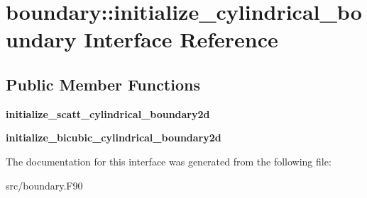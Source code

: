 \hypertarget{interfaceboundary_1_1initialize__cylindrical__boundary}{}\section{boundary\+:\+:initialize\+\_\+cylindrical\+\_\+boundary Interface Reference}
\label{interfaceboundary_1_1initialize__cylindrical__boundary}
\subsection*{Public Member Functions}
\begin{DoxyCompactItemize}
\item 
\mbox{\label{interfaceboundary_1_1initialize__cylindrical__boundary_a6fdef441d406e174754c61aff96a032e}} 
{\bfseries initialize\+\_\+scatt\+\_\+cylindrical\+\_\+boundary2d}
\item 
\mbox{\label{interfaceboundary_1_1initialize__cylindrical__boundary_a354b0e3cda3b636f99e59d5ca48a893e}} 
{\bfseries initialize\+\_\+bicubic\+\_\+cylindrical\+\_\+boundary2d}
\end{DoxyCompactItemize}


The documentation for this interface was generated from the following file\+:\begin{DoxyCompactItemize}
\item 
src/boundary.\+F90\end{DoxyCompactItemize}
